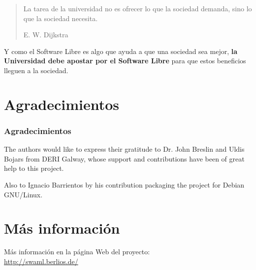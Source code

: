 \documentclass[spanish,notes=hide]{beamer}
\begin{document}
\frame
{

  \begin{quote}
    \begin{Large}
      La tarea de la universidad no es ofrecer lo que la sociedad demanda, sino lo que la sociedad necesita.
    \end{Large}
    \begin{flushright}E. W. Dijkstra\end{flushright}
  \end{quote}

  \vspace{1cm}

  \begin{Large}
    Y como el Software Libre es algo que ayuda a que una sociedad sea mejor, 
    \textbf{la Universidad debe apostar por el Software Libre} para que estos
    beneficios lleguen a la sociedad.
  \end{Large}

}

\appendix

\section{Agradecimientos}
\frame
{
  \frametitle{Agradecimientos}
  
  \begin{Large}
    The authors would like to express their gratitude to Dr. John Breslin and 
    Uldis Bojars from DERI Galway, whose support and contributions have been 
    of great help to this project. 
  \end{Large}

  \vspace{1cm}

  \begin{Large}
    Also to Ignacio Barrientos by his contribution packaging the project for 
    Debian GNU/Linux.
  \end{Large}
}

\section{Más información}
\frame
{
  \begin{center}
    Más información en la página Web del proyecto:\\
    \vspace{1cm}
    \LARGE{\href{http://swaml.berlios.de/}{http://swaml.berlios.de/}}\\
  \end{center}

}
\end{document}
